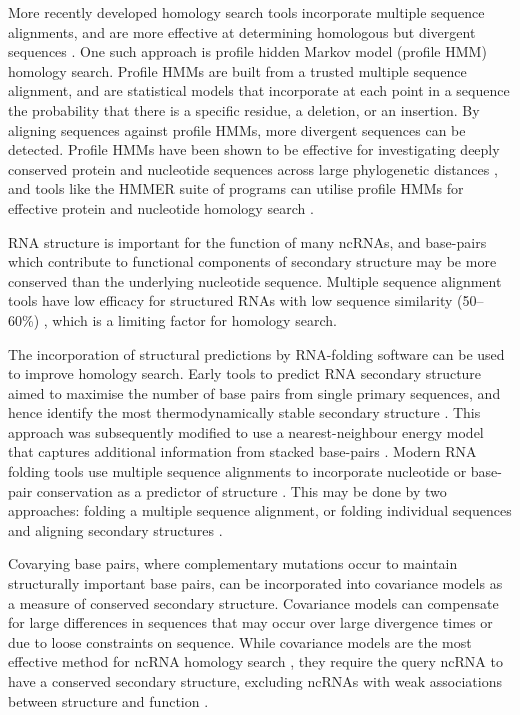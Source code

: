 More recently developed homology search tools incorporate multiple sequence alignments, and are more effective at determining homologous but divergent sequences \citep{Park1998-lu,Lindahl2000-ra}. One such approach is profile hidden Markov model (profile HMM) homology search. Profile HMMs are built from a trusted multiple sequence alignment, and are statistical models that incorporate at each point in a sequence the probability that there is a specific residue, a deletion, or an insertion. By aligning sequences against profile HMMs, more divergent sequences can be detected. Profile HMMs have been shown to be effective for investigating deeply conserved protein \citep{Madera2002-mk} and nucleotide sequences across large phylogenetic distances \citep{Freyhult2007-gz}, and tools like the HMMER \citep{Eddy2009-hmmer} suite of programs can utilise profile HMMs for effective protein and nucleotide homology search \citep{Eddy2011-hi}.\par

RNA structure is important for the function of many ncRNAs, and base-pairs which contribute to functional components of secondary structure may be more conserved than the underlying nucleotide sequence. Multiple sequence alignment tools have low efficacy for structured RNAs with low sequence similarity (50--60\%) \citep{Gardner2005-la}, which is a limiting factor for homology search. 

The incorporation of structural predictions by RNA-folding software can be used to improve homology search. Early tools to predict RNA secondary structure aimed to maximise the number of base pairs from single primary sequences, and hence identify the most thermodynamically stable secondary structure \citep{tinoco1971,tinoco1973,Nussinov1980-ka}. This approach was subsequently modified to use a nearest-neighbour energy model that captures additional information from stacked base-pairs \citep{Zuker1981-er}. Modern RNA folding tools use multiple sequence alignments to incorporate nucleotide or base-pair conservation as a predictor of structure \citep{Bujnicki_2013}. This may be done by two approaches: folding a multiple sequence alignment, or folding individual sequences and aligning secondary structures \citep{Gardner2004-uo}. 

Covarying base pairs, where complementary mutations occur to maintain structurally important base pairs, can be incorporated into covariance models as a measure of conserved secondary structure. Covariance models can compensate for large differences in sequences that may occur over large divergence times or due to loose constraints on sequence. While covariance models are the most effective method for ncRNA homology search \citep{Freyhult2007-gz}, they require the query ncRNA to have a conserved secondary structure, excluding ncRNAs with weak associations between structure and function \citep{Peterman2014-cs,Rivas2017-lg}.\par 

